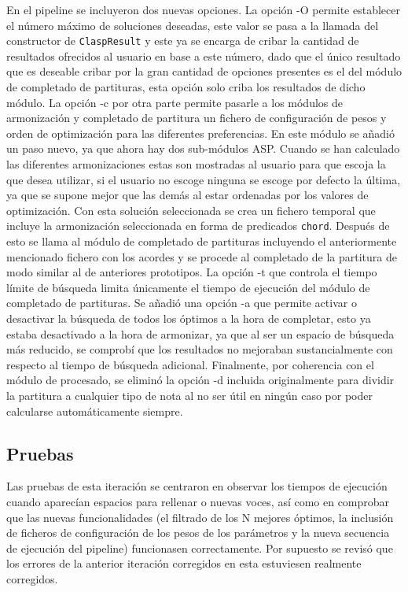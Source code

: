 En el pipeline se incluyeron dos nuevas opciones. La opción -O permite establecer el número máximo de soluciones deseadas, este valor se pasa a la llamada del constructor de \texttt{ClaspResult} y este ya se encarga de cribar la cantidad de resultados ofrecidos al usuario en base a este número, dado que el único resultado que es deseable cribar por la gran cantidad de opciones presentes es el del módulo de completado de partituras, esta opción solo criba los resultados de dicho módulo. La opción -c por otra parte permite pasarle a los módulos de armonización y completado de partitura un fichero de configuración de pesos y orden de optimización para las diferentes preferencias. En este módulo se añadió un paso nuevo, ya que ahora hay dos sub-módulos ASP. Cuando se han calculado las diferentes armonizaciones estas son mostradas al usuario para que escoja la que desea utilizar, si el usuario no escoge ninguna se escoge por defecto la última, ya que se supone mejor que las demás al estar ordenadas por los valores de optimización. Con esta solución seleccionada se crea un fichero temporal que incluye la armonización seleccionada en forma de predicados \texttt{chord}. Después de esto se llama al módulo de completado de partituras incluyendo el anteriormente mencionado fichero con los acordes y se procede al completado de la partitura de modo similar al de anteriores prototipos. La opción -t que controla el tiempo límite de búsqueda limita únicamente el tiempo de ejecución del módulo de completado de partituras. Se añadió una opción -a que permite activar o desactivar la búsqueda de todos los óptimos a la hora de completar, esto ya estaba desactivado a la hora de armonizar, ya que al ser un espacio de búsqueda más reducido, se comprobí que los resultados no mejoraban sustancialmente con respecto al tiempo de búsqueda adicional. Finalmente, por coherencia con el módulo de procesado, se eliminó la opción -d incluida originalmente para dividir la partitura a cualquier tipo de nota al no ser útil en ningún caso por poder calcularse automáticamente siempre.

\subsection{Pruebas}
\label{subsec:eighth_iteration_test}
Las pruebas de esta iteración se centraron en observar los tiempos de ejecución cuando aparecían espacios para rellenar o nuevas voces, así como en comprobar que las nuevas funcionalidades (el filtrado de los N mejores óptimos, la inclusión de ficheros de configuración de los pesos de los parámetros y la nueva secuencia de ejecución del pipeline) funcionasen correctamente. Por supuesto se revisó que los errores de la anterior iteración corregidos en esta estuviesen realmente corregidos.


